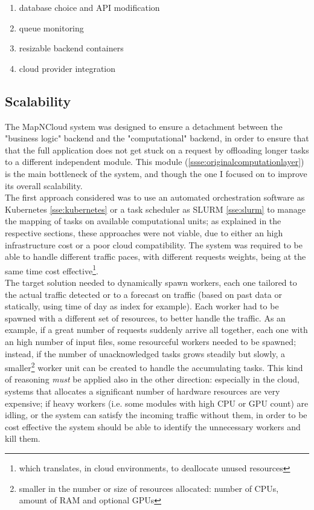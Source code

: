 \begin{enumerate}
	\item database choice and API modification
	\item queue monitoring
	\item resizable backend containers
	\item cloud provider integration
\end{enumerate}

\subsection{Scalability}
  The MapNCloud system was designed to ensure a detachment between the "business logic" backend and the "computational" backend, in order to ensure that that the full application does not get stuck on a request by offloading longer tasks to a different independent module. This module (\ref{ssse:originalcomputationlayer}) is the main bottleneck of the system, and though the one I focused on to improve its overall scalability.\\
  The first approach considered was to use an automated orchestration software as Kubernetes \ref{sse:kubernetes} or a task scheduler as SLURM \ref{sse:slurm} to manage the mapping of tasks on available computational units; as explained in the respective sections, these approaches were not viable, due to either an high infrastructure cost or a poor cloud compatibility. The system was required to be able to handle different traffic paces, with different requests weights, being at the same time cost effective\footnote{which translates, in cloud environments, to deallocate unused resources}.\\
  The target solution needed to dynamically spawn workers, each one tailored to the actual traffic detected or to a forecast on traffic (based on past data or statically, using time of day as index for example). Each worker had to be spawned with a different set of resources, to better handle the traffic. As an example, if a great number of requests suddenly arrive all together, each one with an high number of input files, some resourceful workers needed to be spawned; instead, if the number of unacknowledged tasks grows steadily but slowly, a smaller\footnote{smaller in the number or size of resources allocated: number of CPUs, amount of RAM and optional GPUs} worker unit can be created to handle the accumulating tasks. This kind of reasoning \textit{must} be applied also in the other direction: especially in the cloud, systems that allocates a significant number of hardware resources are very expensive; if heavy workers (i.e. some modules with high CPU or GPU count) are idling, or the system can satisfy the incoming traffic without them, in order to be cost effective the system should be able to identify the unnecessary workers and kill them. 
